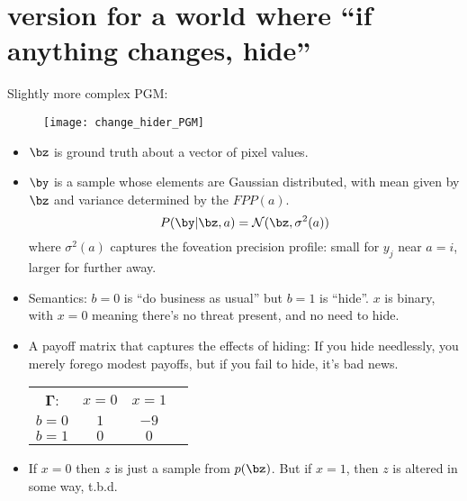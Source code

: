 \documentclass[11pt]{article}
\begin{document}




\section{version for a world where ``if anything changes, hide''}

Slightly more complex PGM:

\begin{figure}[Hh!]
  \centering
  \texttt{[image: change\_hider\_PGM]}
  \caption{\label{fig:change_hider_PGM}}
\end{figure}

\begin{itemize}
\item $\bz$ is ground truth about a vector of pixel values.

\item $\by$ is a sample whose elements are Gaussian distributed, with mean given by $\bz$ and variance determined by the $FPP(a)$.
\[
P(\by | \bz, a) = \mathcal{N}(\bz, \sigma^2(a))
\]
where $\sigma^2(a)$ captures the foveation precision profile: small
for $y_j$ near $a=i$, larger for further away.

\item Semantics: $b=0$ is ``do business as usual'' but $b=1$ is
  ``hide''.  $x$ is binary, with $x=0$ meaning there's no threat
  present, and no need to hide.

\item A payoff matrix that captures the effects of hiding: If you hide needlessly, you merely forego modest payoffs, but if you fail to hide, it's bad news.
\\
\begin{tabular}{cccc}
$\boldsymbol\Gamma$: &  %
$x=0$ & $x=1$ \\
\cline{2-3}
$b=0$ & 
\multicolumn{1}{|p{1cm}}{$1$} & \multicolumn{1}{|p{1cm}|}{$-9$} \\
\cline{2-3}
$b=1$ &
\multicolumn{1}{|p{1cm}}{$0$} & \multicolumn{1}{|p{1cm}|}{$0$} \\
\cline{2-3}
\end{tabular}



\item If $x=0$ then $z$ is just a sample from $p(\bz)$. But if $x=1$,
  then $z$ is altered in some way, t.b.d.
\[

\]


\end{itemize}
\end{document}
